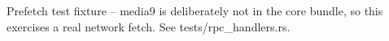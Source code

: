 \documentclass{article}
\begin{document}
Prefetch test fixture -- media9 is deliberately not in the core bundle, so this exercises
a real network fetch. See tests/rpc_handlers.rs.
\end{document}
